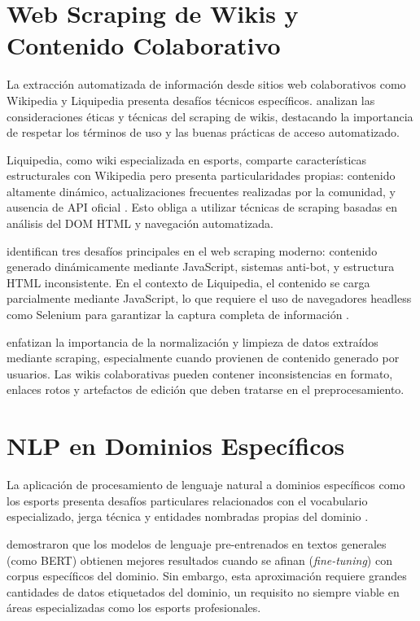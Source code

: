 \section{Web Scraping de Wikis y Contenido Colaborativo}

La extracción automatizada de información desde sitios web colaborativos como Wikipedia y Liquipedia presenta desafíos técnicos específicos. \cite{wikiscraping2018} analizan las consideraciones éticas y técnicas del scraping de wikis, destacando la importancia de respetar los términos de uso y las buenas prácticas de acceso automatizado.

Liquipedia, como wiki especializada en esports, comparte características estructurales con Wikipedia pero presenta particularidades propias: contenido altamente dinámico, actualizaciones frecuentes realizadas por la comunidad, y ausencia de API oficial \cite{esportswiki2019}. Esto obliga a utilizar técnicas de scraping basadas en análisis del DOM HTML y navegación automatizada.

\cite{ferrara2014web} identifican tres desafíos principales en el web scraping moderno: contenido generado dinámicamente mediante JavaScript, sistemas anti-bot, y estructura HTML inconsistente. En el contexto de Liquipedia, el contenido se carga parcialmente mediante JavaScript, lo que requiere el uso de navegadores headless como Selenium para garantizar la captura completa de información \cite{selenium2021automated}.

\cite{mitchell2018web} enfatizan la importancia de la normalización y limpieza de datos extraídos mediante scraping, especialmente cuando provienen de contenido generado por usuarios. Las wikis colaborativas pueden contener inconsistencias en formato, enlaces rotos y artefactos de edición que deben tratarse en el preprocesamiento.

\section{NLP en Dominios Específicos}

La aplicación de procesamiento de lenguaje natural a dominios específicos como los esports presenta desafíos particulares relacionados con el vocabulario especializado, jerga técnica y entidades nombradas propias del dominio \cite{domain2020nlp}.

\cite{beltagy2019scibert} demostraron que los modelos de lenguaje pre-entrenados en textos generales (como BERT) obtienen mejores resultados cuando se afinan (\textit{fine-tuning}) con corpus específicos del dominio. Sin embargo, esta aproximación requiere grandes cantidades de datos etiquetados del dominio, un requisito no siempre viable en áreas especializadas como los esports profesionales.

